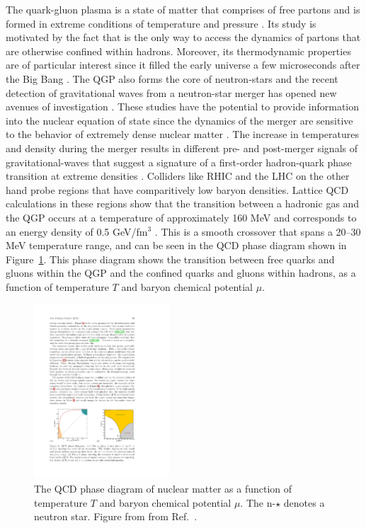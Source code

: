 The quark-gluon plasma is a state of matter that comprises of free partons and is formed in extreme conditions of temperature and pressure \cite{SHURYAK198071}.
Its study is motivated by the fact that is the only way to access the dynamics of partons that are otherwise confined within hadrons. Moreover, its thermodynamic properties are
of particular interest since it filled the early universe a few microseconds after the Big Bang \cite{PhysRevLett.34.1353}.
The QGP also forms the core of neutron-stars \cite{Linde_1979} and the recent detection of gravitational waves from a neutron-star merger \cite{PhysRevLett.119.161101} has opened new avenues 
of investigation \cite{Han:2018mtj, PhysRevD.99.023009, PhysRevLett.122.061101}. These studies have the potential to provide information into the nuclear equation of state since the dynamics of the 
merger are sensitive to the behavior of extremely dense nuclear matter \cite{PhysRevD.86.063001}. The increase in temperatures and density during the merger results in different 
pre- and post-merger signals of gravitational-waves that suggest a signature of a first-order hadron-quark phase transition at extreme densities \cite{PhysRevLett.122.061102}. Colliders 
like RHIC and the LHC on the other hand probe regions that have comparitively low baryon densities. Lattice QCD calculations in these regions show that the transition between a hadronic gas and the QGP occurs 
at a temperature of approximately 160 MeV and corresponds to an energy density of 0.5 GeV/fm$^3$ \cite{Borsanyi:2010bp}. This is a smooth crossover that spans a 20--30 MeV temperature range, and can 
be seen in the QCD phase diagram shown in Figure~\ref{fig:qcd_phase}. This phase diagram shows the transition between free quarks and gluons within the QGP and the confined quarks and gluons 
within hadrons, as a function of temperature $T$ and baryon chemical potential $\mu$.
\begin{figure}[htbp]
\begin{center}
\includegraphics[width=0.45\textwidth]{figures/theory/qcd_phase}
\caption{The QCD phase diagram of nuclear matter as a function of temperature $T$ and baryon chemical potential $\mu$. The n-$\star$ denotes a neutron star. Figure from from Ref.~\cite{Kronfeld:2012uk}. }
\label{fig:qcd_phase}
\end{center}
\end{figure}

